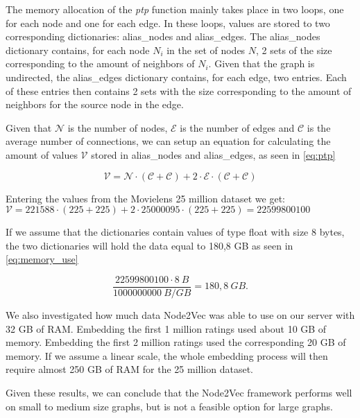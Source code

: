 The memory allocation of the \textit{ptp} function mainly takes place in two loops, one for each node and one for each edge.
In these loops, values are stored to two corresponding dictionaries: alias\_nodes and alias\_edges.
The alias\_nodes dictionary contains, for each node $N_i$ in the set of nodes $N$, 2 sets of the size corresponding to the amount of neighbors of $N_i$.
Given that the graph is undirected, the alias\_edges dictionary contains, for each edge, two entries. Each of these entries then contains 2 sets with the size corresponding to the amount of neighbors for the source node in the edge.

Given that $\mathcal{N}$ is the number of nodes, $\mathcal{E}$ is the number of edges and $\mathcal{C}$ is the average number of connections, we can setup an equation for calculating the amount of values $\mathcal{V}$ stored in alias\_nodes and alias\_edges, as seen in \autoref{eq:ptp}

\begin{equation}
  \label{eq:ptp}
  \mathcal{V} = \mathcal{N} \cdot (\mathcal{C} + \mathcal{C}) + 2 \cdot \mathcal{E} \cdot (\mathcal{C} + \mathcal{C})
\end{equation}

Entering the values from the Movielens 25 million dataset we get: $\mathcal{V} = 221588 \cdot (225 + 225) + 2 \cdot 25000095 \cdot (225 + 225) = 22599800100$


If we assume that the dictionaries contain values of type float with size 8 bytes, the two dictionaries will hold the data equal to 180,8 GB as seen in \autoref{eq:memory_use}

\begin{equation}
  \label{eq:memory_use}
  \frac{22599800100 \cdot 8 \ B}{1000000000 \ B/GB} = 180,8 \ GB.
\end{equation}

We also investigated how much data Node2Vec was able to use on our server with 32 GB of RAM. Embedding the first 1 million ratings used about 10 GB of memory. Embedding the first 2 million ratings used the corresponding 20 GB of memory. If we assume a linear scale, the whole embedding process will then require almost 250 GB of RAM for the 25 million dataset.

Given these results, we can conclude that the Node2Vec framework performs well on small to medium size graphs, but is not a feasible option for large graphs.


